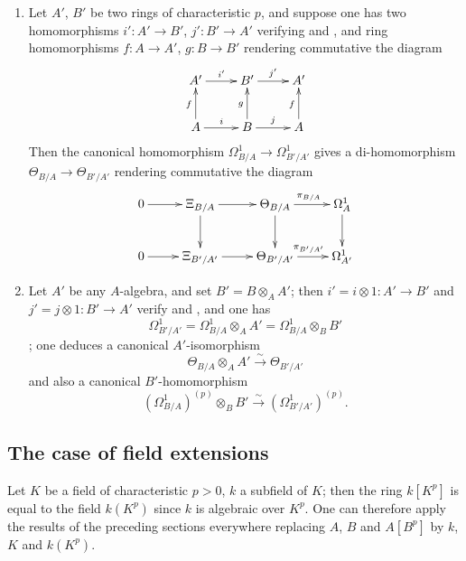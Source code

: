 \begin{remarks}[21.3.6]
\label{0.21.3.6}
\begin{enumerate}
  \item[\rm(i)] Let $A'$, $B'$ be two rings of characteristic $p$, and suppose one has two homomorphisms $i':A'\to B'$, $j':B'\to A'$ verifying  and , and ring homomorphisms $f:A\to A'$, $g:B\to B'$ rendering commutative the diagram
\[
\xymatrix{
  A' \ar[r]^{i'} & B' \ar[r]^{j'} & A' \\
  A \ar[u]^f \ar[r]^{i} & B \ar[u]^g \ar[r]^{j} & A \ar[u]^f
}
\]
Then the canonical homomorphism $\Omega^1_{B/A}\to\Omega^1_{B'/A'}$  gives a di-homomorphism $\Theta_{B/A}\to\Theta_{B'/A'}$ rendering commutative the diagram
\[
\xymatrix{
  0 \ar[r] & \Xi_{B/A} \ar[r] \ar[d] & \Theta_{B/A} \ar[r]^{\pi_{B/A}} \ar[d] & \Omega^1_A \ar[d] \\
  0 \ar[r] & \Xi_{B'/A'} \ar[r] & \Theta_{B'/A'} \ar[r]^{\pi_{B'/A'}} & \Omega^1_{A'}
}
\]

  \item[\rm(ii)] Let $A'$ be any $A$-algebra, and set $B'=B\otimes_A A'$; then $i'=i\otimes 1:A'\to B'$ and $j'=j\otimes 1:B'\to A'$ verify  and , and one has
\[
  \Omega^1_{B'/A'}=\Omega^1_{B/A}\otimes_A A'=\Omega^1_{B/A}\otimes_B B'
\]
; one deduces a canonical $A'$-isomorphism
\begin{equation}
\tag{21.3.6.1}
  \label{0.21.3.6.1}
  \Theta_{B/A}\otimes_A A'\xrightarrow{\sim}\Theta_{B'/A'}
\end{equation}
and also a canonical $B'$-homomorphism
\begin{equation}
\tag{21.3.6.2}
  \label{0.21.3.6.2}
  (\Omega^1_{B/A})^{(p)}\otimes_B B'\xrightarrow{\sim}(\Omega^1_{B'/A'})^{(p)}.
\end{equation}
\end{enumerate}
\end{remarks}

\subsection{The case of field extensions}
\label{subsection:0.21.4}

\begin{env}[21.4.0]
\label{0.21.4.0}
Let $K$ be a field of characteristic $p>0$, $k$ a subfield of $K$; then the ring $k[K^p]$ is equal to the field $k(K^p)$ since $k$ is algebraic over $K^p$.
One can therefore apply the results of the preceding sections everywhere replacing $A$, $B$ and $A[B^p]$ by $k$, $K$ and $k(K^p)$.
\end{env}

